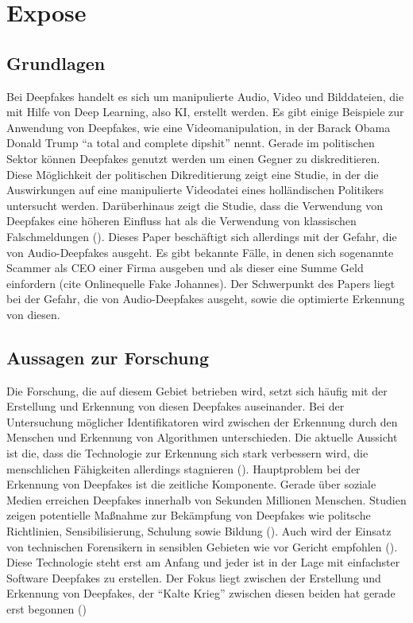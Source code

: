 \section{Expose}



\subsection{Grundlagen}
Bei Deepfakes handelt es sich um manipulierte Audio, Video und Bilddateien, die mit Hilfe von Deep Learning, also KI, erstellt werden.
Es gibt einige Beispiele zur Anwendung von Deepfakes, wie eine Videomanipulation, in der Barack Obama Donald Trump ``a total and complete dipshit'' nennt.
Gerade im politischen Sektor können Deepfakes genutzt werden um einen Gegner zu diskreditieren.
Diese Möglichkeit der politischen Dikreditierung zeigt eine Studie, in der die Auswirkungen auf eine manipulierte Videodatei eines holländischen Politikers untersucht werden.
Darüberhinaus zeigt die Studie, dass die Verwendung von Deepfakes eine höheren Einfluss hat als die Verwendung von klassischen Falschmeldungen (\cite{Dobber2020}).
Dieses Paper beschäftigt sich allerdings mit der Gefahr, die von Audio-Deepfakes ausgeht.
Es gibt bekannte Fälle, in denen sich sogenannte Scammer als CEO einer Firma ausgeben und als dieser eine Summe Geld einfordern (cite Onlinequelle Fake Johannes).
Der Schwerpunkt des Papers liegt bei der Gefahr, die von Audio-Deepfakes ausgeht, sowie die optimierte Erkennung von diesen.
\subsection{Aussagen zur Forschung}
Die Forschung, die auf diesem Gebiet betrieben wird, setzt sich häufig mit der Erstellung und Erkennung von diesen Deepfakes auseinander.
Bei der Untersuchung möglicher Identifikatoren wird zwischen der Erkennung durch den Menschen und Erkennung von Algorithmen unterschieden.
Die aktuelle Aussicht ist die, dass die Technologie zur Erkennung sich stark verbessern wird, die menschlichen Fähigkeiten allerdings stagnieren (\cite{Mueller2022}).
Hauptproblem bei der Erkennung von Deepfakes ist die zeitliche Komponente.
Gerade über soziale Medien erreichen Deepfakes innerhalb von Sekunden Millionen Menschen.
Studien zeigen potentielle Maßnahme zur Bekämpfung von Deepfakes wie politsche Richtlinien, Sensibilisierung, Schulung sowie Bildung (\cite{Shahzad2022}).
Auch wird der Einsatz von technischen Forensikern in sensiblen Gebieten wie vor Gericht empfohlen (\cite{Jones2022}).
Diese Technologie steht erst am Anfang und jeder ist in der Lage mit einfachster Software Deepfakes zu erstellen.
Der Fokus liegt zwischen der Erstellung und Erkennung von Deepfakes, der ``Kalte Krieg'' zwischen diesen beiden hat gerade erst begonnen (\cite{Masood2022})
